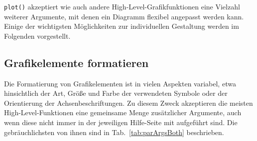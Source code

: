 \lstinline!plot()! akzeptiert wie auch andere High-Level-Grafikfunktionen eine Vielzahl weiterer Argumente, mit denen ein Diagramm flexibel angepasst werden kann. Einige der wichtigsten Möglichkeiten zur individuellen Gestaltung werden im Folgenden vorgestellt.

\subsection{Grafikelemente formatieren}
\label{sec:par}

Die Formatierung von Grafikelementen ist in vielen Aspekten variabel, etwa hinsichtlich der Art, Größe und Farbe der verwendeten Symbole oder der Orientierung der Achsenbeschriftungen. Zu diesem Zweck akzeptieren die meisten High-Level-Funktionen eine gemeinsame Menge zusätzlicher Argumente, auch wenn diese nicht immer in der jeweiligen Hilfe-Seite mit aufgeführt sind. Die gebräuchlichsten von ihnen sind in Tab.\ \ref{tab:parArgsBoth} beschrieben.


